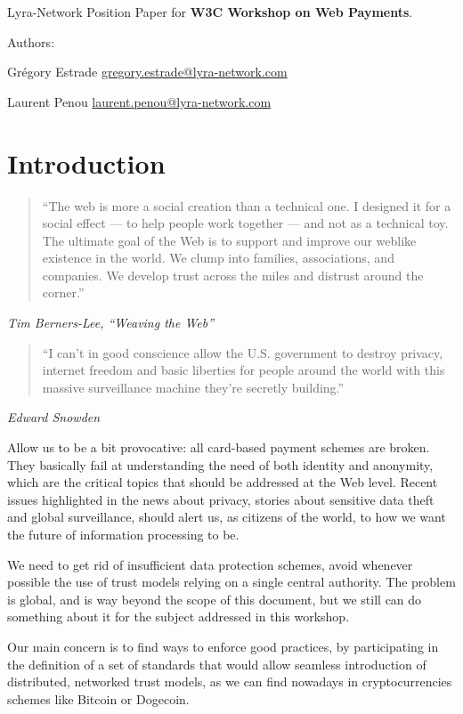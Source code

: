 Lyra-Network Position Paper for \textbf{W3C Workshop on Web Payments}.

Authors:

Grégory Estrade
\href{mailto:gregory.estrade@lyra-network.com}{gregory.estrade@lyra-network.com}

Laurent Penou
\href{mailto:laurent.penou@lyra-network.com}{laurent.penou@lyra-network.com}

\section{Introduction}\label{introduction}

\begin{quote}
``The web is more a social creation than a technical one. I designed it
for a social effect --- to help people work together --- and not as a
technical toy. The ultimate goal of the Web is to support and improve
our weblike existence in the world. We clump into families,
associations, and companies. We develop trust across the miles and
distrust around the corner.''
\end{quote}

\emph{Tim Berners-Lee, ``Weaving the Web''}

\begin{quote}
``I can't in good conscience allow the U.S. government to destroy
privacy, internet freedom and basic liberties for people around the
world with this massive surveillance machine they're secretly
building.''
\end{quote}

\emph{Edward Snowden}

Allow us to be a bit provocative: all card-based payment schemes are
broken. They basically fail at understanding the need of both identity
and anonymity, which are the critical topics that should be addressed at
the Web level. Recent issues highlighted in the news about privacy,
stories about sensitive data theft and global surveillance, should alert
us, as citizens of the world, to how we want the future of information
processing to be.

We need to get rid of insufficient data protection schemes, avoid
whenever possible the use of trust models relying on a single central
authority. The problem is global, and is way beyond the scope of this
document, but we still can do something about it for the subject
addressed in this workshop.

Our main concern is to find ways to enforce good practices, by
participating in the definition of a set of standards that would allow
seamless introduction of distributed, networked trust models, as we can
find nowadays in cryptocurrencies schemes like Bitcoin or Dogecoin.

